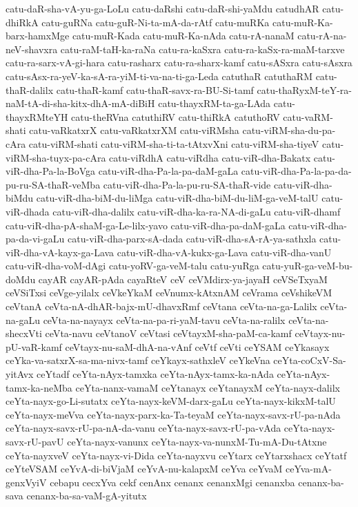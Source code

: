 {catu-daR-sha-vA-yu-ga-LoLu
catu-daRshi
catu-daR-shi-yaMdu
catudhAR
catu-dhiRkA
catu-guRNa
catu-guR-Ni-ta-mA-da-rAtf
catu-muRKa
catu-muR-Ka-barx-hamxMge
catu-muR-Kada
catu-muR-Ka-nAda
catu-rA-nanaM
catu-rA-na-neV-shavxra
catu-raM-taH-ka-raNa
catu-ra-kaSxra
catu-ra-kaSx-ra-maM-tarxve
catu-ra-sarx-vA-gi-hara
catu-rasharx
catu-ra-sharx-kamf
catu-sASxra
catu-sAsxra
catu-sAsx-ra-yeV-ka-sA-ra-yiM-ti-va-na-ti-ga-Leda
catuthaR
catuthaRM
catu-thaR-dalilx
catu-thaR-kamf
catu-thaR-savx-ra-BU-Si-tamf
catu-thaRyxM-teY-ra-naM-tA-di-sha-kitx-dhA-mA-diBiH
catu-thayxRM-ta-ga-LAda
catu-thayxRMteYH
catu-theRVna
catuthiRV
catu-thiRkA
catuthoRV
catu-vaRM-shati
catu-vaRkatxrX
catu-vaRkatxrXM
catu-viRMsha
catu-viRM-sha-du-pa-cAra
catu-viRM-shati
catu-viRM-sha-ti-ta-tAtxvXni
catu-viRM-sha-tiyeV
catu-viRM-sha-tuyx-pa-cAra
catu-viRdhA
catu-viRdha
catu-viR-dha-Bakatx
catu-viR-dha-Pa-la-BoVga
catu-viR-dha-Pa-la-pa-daM-gaLa
catu-viR-dha-Pa-la-pa-da-pu-ru-SA-thaR-veMba
catu-viR-dha-Pa-la-pu-ru-SA-thaR-vide
catu-viR-dha-biMdu
catu-viR-dha-biM-du-liMga
catu-viR-dha-biM-du-liM-ga-veM-talU
catu-viR-dhada
catu-viR-dha-dalilx
catu-viR-dha-ka-ra-NA-di-gaLu
catu-viR-dhamf
catu-viR-dha-pA-shaM-ga-Le-lilx-yavo
catu-viR-dha-pa-daM-gaLa
catu-viR-dha-pa-da-vi-gaLu
catu-viR-dha-parx-sA-dada
catu-viR-dha-sA-rA-ya-sathxla
catu-viR-dha-vA-kayx-ga-Lava
catu-viR-dha-vA-kukx-ga-Lava
catu-viR-dha-vanU
catu-viR-dha-voM-dAgi
catu-yoRV-ga-veM-talu
catu-yuRga
catu-yuR-ga-veM-bu-doMdu
cayAR
cayAR-pAda
cayaRteV
ceV
ceVMdirx-ya-jayaH
ceVSeTxyaM
ceVSiTxsi
ceVge-yilalx
ceVkeYkaM
ceVnumx-kAtxnAM
ceVrama
ceVshikeVM
ceVtanA
ceVta-nA-dhAR-bajx-mU-dhavxRmf
ceVtana
ceVta-na-ga-Lalilx
ceVta-na-gaLu
ceVta-na-nayayx
ceVta-na-pa-ri-yaM-tavu
ceVta-na-ralilx
ceVta-na-shecxVti
ceVta-navu
ceVtanoV
ceVtasi
ceVtayxM-sha-paM-ca-kamf
ceVtayx-nu-pU-vaR-kamf
ceVtayx-nu-saM-dhA-na-vAnf
ceVtf
ceVti
ceYSAM
ceYkasayx
ceYka-va-satxrX-sa-ma-nivx-tamf
ceYkayx-sathxleV
ceYkeVna
ceYta-coCxV-Sa-yitAvx
ceYtadf
ceYta-nAyx-tamxka
ceYta-nAyx-tamx-ka-nAda
ceYta-nAyx-tamx-ka-neMba
ceYta-nanx-vamaM
ceYtanayx
ceYtanayxM
ceYta-nayx-dalilx
ceYta-nayx-go-Li-sutatx
ceYta-nayx-keVM-darx-gaLu
ceYta-nayx-kikxM-talU
ceYta-nayx-meVva
ceYta-nayx-parx-ka-Ta-teyaM
ceYta-nayx-savx-rU-pa-nAda
ceYta-nayx-savx-rU-pa-nA-da-vanu
ceYta-nayx-savx-rU-pa-vAda
ceYta-nayx-savx-rU-pavU
ceYta-nayx-vanunx
ceYta-nayx-va-nunxM-Tu-mA-Du-tAtxne
ceYta-nayxveV
ceYta-nayx-vi-Dida
ceYta-nayxvu
ceYtarx
ceYtarxshacx
ceYtatf
ceYteVSAM
ceYvA-di-biVjaM
ceYvA-nu-kalapxM
ceYva
ceYvaM
ceYva-mA-genxVyiV
cebapu
cecxYva
cekf
cenAnx
cenanx
cenanxMgi
cenanxba
cenanx-ba-sava
cenanx-ba-sa-vaM-gA-yitutx
}
